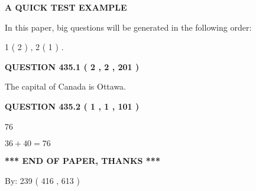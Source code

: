 \documentclass[12pt]{article}
\begin{document}
   
   
   
   
   
 \vspace{0.2in}
{\LARGE {\textbf{ A QUICK TEST EXAMPLE}}}
   
   
   
\vspace{0.2in}
   
In this paper, big questions will be generated in the following order: 
   
   
   1 ( 2 )
 ,
   2 ( 1 )
 .
  
\vspace{0.2in}
  
{\textbf{\Large{QUESTION
435.1 
 ( 2 , 2 , 201 )
}}}
  
  
 
 
\noindent{}
 
 
The capital of Canada is Ottawa.
 
 
 
 
  
\vspace{0.2in}
  
{\textbf{\Large{QUESTION
435.2 
 ( 1 , 1 , 101 )
}}}
  
  
 
 
\noindent{}

76
 
 
 
 
\noindent{}

$ %
36 +  %
40=   %
76$
 
 
   
   
 \vspace{0.2in}
 
   
   
   
   
\vspace{1.0in} 
{\textbf{\large{ *** END OF PAPER, THANKS *** }}} 
   
   
\hspace{1.0in} By: 
 239 ( 416 ,  613 )
   
   
   
   
\newpage 
\setcounter{page}{ 
   436001 } 
   
   
   
\end{document}
